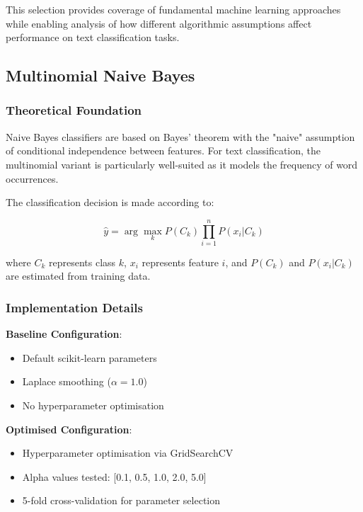 \documentclass[11pt,a4paper]{article}
\begin{document}
This selection provides coverage of fundamental machine learning approaches while enabling analysis of how different algorithmic assumptions affect performance on text classification tasks.

\subsection{Multinomial Naive Bayes}

\subsubsection{Theoretical Foundation}

Naive Bayes classifiers are based on Bayes' theorem with the "naive" assumption of conditional independence between features. For text classification, the multinomial variant is particularly well-suited as it models the frequency of word occurrences.

The classification decision is made according to:

\begin{equation}
\hat{y} = \arg\max_{k} P(C_k) \prod_{i=1}^{n} P(x_i|C_k)
\end{equation}

where $C_k$ represents class $k$, $x_i$ represents feature $i$, and $P(C_k)$ and $P(x_i|C_k)$ are estimated from training data.

\subsubsection{Implementation Details}

\textbf{Baseline Configuration}:
\begin{itemize}
    \item Default scikit-learn parameters
    \item Laplace smoothing ($\alpha = 1.0$)
    \item No hyperparameter optimisation
\end{itemize}

\textbf{Optimised Configuration}:
\begin{itemize}
    \item Hyperparameter optimisation via GridSearchCV
    \item Alpha values tested: [0.1, 0.5, 1.0, 2.0, 5.0]
    \item 5-fold cross-validation for parameter selection
\end{itemize}
\end{document}
